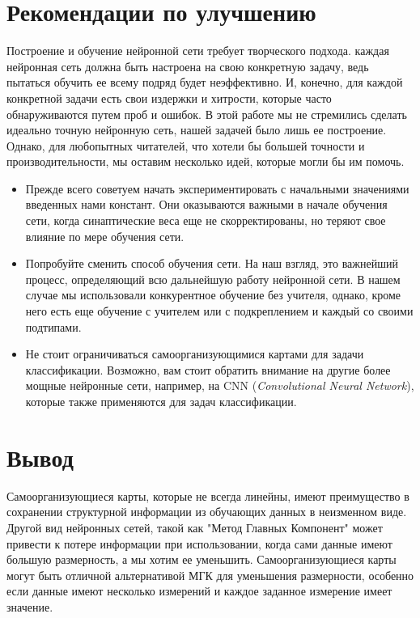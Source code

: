 \documentclass[a4paper,12pt]{report}
\begin{document}
\section{Рекомендации по улучшению}
Построение и обучение нейронной сети требует творческого подхода.
каждая нейронная сеть должна быть настроена на свою конкретную задачу,
ведь пытаться обучить ее всему подряд будет неэффективно. И, конечно,
для каждой конкретной задачи есть свои издержки и хитрости, которые
часто обнаруживаются путем проб и ошибок. В этой
работе мы не стремились сделать идеально точную нейронную сеть, нашей
задачей было лишь ее построение. Однако, для любопытных читателей, что
хотели бы большей точности и производительности, мы оставим несколько
идей, которые могли бы им помочь.
\begin{itemize}
    \item Прежде всего советуем начать экспериментировать с начальными
        значениями введенных нами констант. Они оказываются важными
        в начале обучения сети, когда синаптические
        веса еще не скорректированы, но теряют свое влияние по мере
        обучения сети.
    \item Попробуйте сменить способ обучения сети. На наш взгляд, это
        важнейший процесс, определяющий всю дальнейшую работу
        нейронной сети. В нашем случае мы использовали конкурентное
        обучение без учителя, однако, кроме него есть еще обучение с
        учителем или с подкреплением и каждый со своими подтипами.
    \item Не стоит ограничиваться самоорганизующимися картами для
        задачи классификации. Возможно, вам стоит обратить внимание на
        другие более мощные нейронные сети, например, на CNN
        (\textit{Convolutional Neural Network}), которые также
        применяются для задач классификации.
\end{itemize}

\section{Вывод}
Самоорганизующиеся карты, которые не всегда линейны, имеют преимущество в сохранении структурной информации из обучающих данных в неизменном виде. Другой вид нейронных сетей,
такой как "Метод Главных Компонент" может привести к потере информации при использовании, когда сами данные имеют большую размерность, а мы хотим ее уменьшить.
Самоорганизующиеся карты могут быть отличной альтернативой МГК для уменьшения размерности, особенно если данные имеют несколько измерений и каждое заданное измерение имеет значение.
\end{document}
